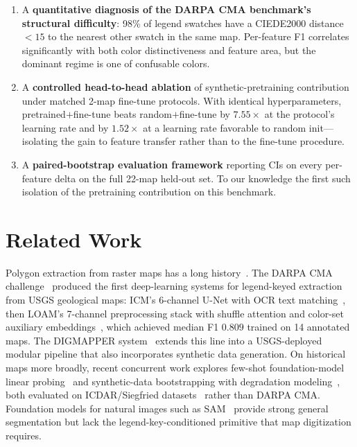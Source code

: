 \documentclass[sigconf,nonacm]{acmart}
\begin{document}
\begin{enumerate}
    \item A \textbf{quantitative diagnosis of the DARPA CMA benchmark's
      structural difficulty}: 98\% of legend swatches have a CIEDE2000
      distance ${<}15$ to the nearest other swatch in the same map. Per-feature
      F1 correlates significantly with both color distinctiveness and feature
      area, but the dominant regime is one of confusable colors.

    \item A \textbf{controlled head-to-head ablation} of synthetic-pretraining
      contribution under matched 2-map fine-tune protocols. With identical
      hyperparameters, pretrained$+$fine-tune beats random$+$fine-tune by
      $7.55\times$ at the protocol's learning rate and by $1.52\times$ at a
      learning rate favorable to random init---isolating the gain to feature
      transfer rather than to the fine-tune procedure.

    \item A \textbf{paired-bootstrap evaluation framework} reporting CIs on
      every per-feature delta on the full 22-map held-out set. To our knowledge
      the first such isolation of the pretraining contribution on this
      benchmark.
\end{enumerate}


\section{Related Work}
\label{sec:related}

Polygon extraction from raster maps has a long history~\cite{chiang2014survey,
liu2019topomap}. The DARPA CMA challenge~\cite{goldman2023cma} produced the
first deep-learning systems for legend-keyed extraction from USGS geological
maps: ICM's 6-channel U-Net with OCR text matching~\cite{luo2023icm}, then
LOAM's 7-channel preprocessing stack with shuffle attention and color-set
auxiliary embeddings~\cite{lin2023loam}, which achieved median F1 $0.809$
trained on 14 annotated maps. The DIGMAPPER system~\cite{duan2025digmapper}
extends this line into a USGS-deployed modular pipeline that also incorporates
synthetic data generation. On historical maps more broadly,
recent concurrent work explores few-shot foundation-model linear
probing~\cite{sterzinger2025fewshot} and synthetic-data bootstrapping with
degradation modeling~\cite{arzoumanidis2025synthetic}, both evaluated on
ICDAR/Siegfried datasets~\cite{chazalon2021icdarmapseg} rather than DARPA CMA.
Foundation models for natural images such as SAM~\cite{kirillov2023sam}
provide strong general segmentation but lack the legend-key-conditioned
primitive that map digitization requires.
\end{document}
